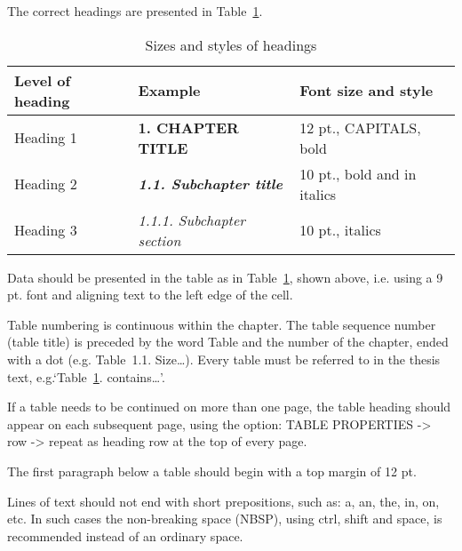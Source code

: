 The correct headings are presented in Table~\ref{tab:heading-styles}.

\begin{table}[h]
	\caption{Sizes and styles of headings}
	\label{tab:heading-styles}
	\begin{tabularx}{\textwidth}{|X|X|X|}
		\hline
		Level of heading	& Example 					& Font size and style \\ \hline
		Heading 1 			& \textbf{1. CHAPTER TITLE}			& 12 pt., CAPITALS, bold \\ \hline
		Heading 2			& \textbf{\textit{1.1. Subchapter title}}		& 10 pt., bold and in italics \\ \hline
		Heading 3			& \textit{1.1.1. Subchapter section}	& 10 pt., italics \\ \hline
	\end{tabularx}
\end{table}

Data should be presented in the table as in Table~\ref{tab:heading-styles}, shown above, i.e. using a 9 pt. font and aligning text to the left edge of the cell.

Table numbering is continuous within the chapter. The table sequence number (table title) is preceded by the word Table and the number of the chapter, ended with a dot (e.g. Table~1.1. Size\ldots). Every table must be referred to in the thesis text, e.g.`Table~\ref{tab:heading-styles}. contains\ldots'.

If a table needs to be continued on more than one page, the table heading should appear on each subsequent page, using the option: TABLE PROPERTIES -> row -> repeat as heading row at the top of every page.

The first paragraph below a table should begin with a top margin of 12 pt.

Lines of text should not end with short prepositions, such as: a, an, the, in, on, etc. In such cases the non-breaking space (NBSP), using ctrl, shift and space, is recommended instead of an ordinary space.
